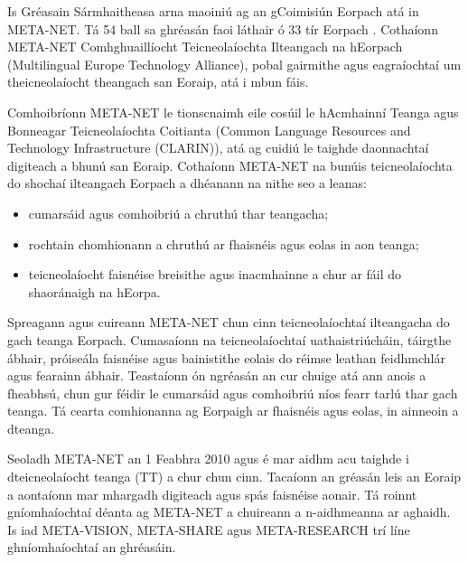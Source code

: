 \begin{multicols}{2}

Is Gréasain Sármhaitheasa arna maoiniú ag an gCoimisiún Eorpach atá in META-NET. Tá 54 ball sa ghréasán faoi láthair ó 33 tír Eorpach \cite{rehm2011}. Cothaíonn META-NET Comhghuaillíocht Teicneolaíochta Ilteangach na hEorpach (Multilingual Europe Technology Alliance), pobal gairmithe agus eagraíochtaí um theicneolaíocht theangach san Eoraip, atá i mbun fáis.
 
Comhoibríonn META-NET le tionscnaimh eile cosúil le hAcmhainní Teanga agus Bonneagar Teicneolaíochta Coitianta (Common Language Resources and Technology Infrastructure (CLARIN)), atá ag cuidiú le taighde daonnachtaí digiteach a bhunú san Eoraip. Cothaíonn META-NET na bunúis teicneolaíochta do shochaí ilteangach Eorpach a dhéanann na nithe seo a leanas:

\begin{itemize}
\item cumarsáid agus comhoibriú a chruthú thar teangacha;
\item rochtain chomhionann a chruthú ar fhaisnéis agus eolas in aon teanga;
\item teicneolaíocht faisnéise breisithe agus inacmhainne a chur ar fáil do shaoránaigh na hEorpa.
\end{itemize}

Spreagann agus cuireann META-NET chun cinn teicneolaíochtaí ilteangacha do gach teanga Eorpach. Cumasaíonn na teicneolaíochtaí uathaistriúcháin, táirgthe ábhair, próiseála faisnéise agus bainistithe eolais do réimse leathan feidhmchlár agus fearainn ábhair. Teastaíonn ón ngréasán an cur chuige atá ann anois a fheabhsú, chun gur féidir le cumarsáid agus comhoibriú níos fearr tarlú thar gach teanga. Tá cearta comhionanna ag Eorpaigh ar fhaisnéis agus eolas, in ainneoin a dteanga.

Seoladh META-NET an 1 Feabhra 2010 agus é mar aidhm acu taighde i dteicneolaíocht teanga (TT) a chur chun cinn. Tacaíonn an gréasán leis an Eoraip a aontaíonn mar mhargadh digiteach agus spás faisnéise aonair. Tá roinnt gníomhaíochtaí déanta ag META-NET a chuireann a n-aidhmeanna ar aghaidh. Is iad META-VISION, META-SHARE agus META-RESEARCH trí líne ghníomhaíochtaí an ghréasáin. 


\end{multicols}
